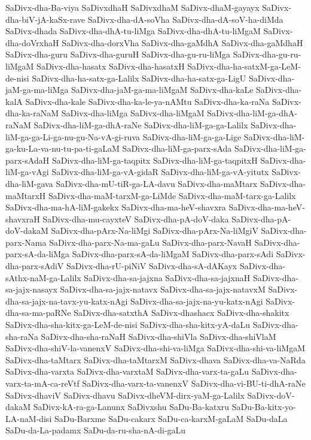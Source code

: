 {SaDivx-dha-Ba-viya
SaDivxdhaH
SaDivxdhaM
SaDivx-dhaM-gayayx
SaDivx-dha-biV-jA-kaSx-rave
SaDivx-dha-dA-soVha
SaDivx-dha-dA-soV-ha-diMda
SaDivx-dhada
SaDivx-dha-dhA-tu-liMga
SaDivx-dha-dhA-tu-liMgaM
SaDivx-dha-doVrxhaH
SaDivx-dha-dorxVha
SaDivx-dha-gaMdhA
SaDivx-dha-gaMdhaH
SaDivx-dha-guru
SaDivx-dha-guruH
SaDivx-dha-gu-ru-liMga
SaDivx-dha-gu-ru-liMgaM
SaDivx-dha-hasatx
SaDivx-dha-hasatxH
SaDivx-dha-ha-satxM-ga-LeM-de-nisi
SaDivx-dha-ha-satx-ga-Lalilx
SaDivx-dha-ha-satx-ga-LigU
SaDivx-dha-jaM-ga-ma-liMga
SaDivx-dha-jaM-ga-ma-liMgaM
SaDivx-dha-kaLe
SaDivx-dha-kalA
SaDivx-dha-kale
SaDivx-dha-ka-le-ya-nAMtu
SaDivx-dha-ka-raNa
SaDivx-dha-ka-raNaM
SaDivx-dha-liMga
SaDivx-dha-liMgaM
SaDivx-dha-liM-ga-dhA-raNaM
SaDivx-dha-liM-ga-dhA-raNe
SaDivx-dha-liM-ga-ga-Lalilx
SaDivx-dha-liM-ga-ga-Li-ga-nu-gu-Na-vA-gi-ruva
SaDivx-dha-liM-ga-ga-Lige
SaDivx-dha-liM-ga-ku-La-va-nu-tu-pa-ti-gaLaM
SaDivx-dha-liM-ga-parx-sAda
SaDivx-dha-liM-ga-parx-sAdaH
SaDivx-dha-liM-ga-taqpitx
SaDivx-dha-liM-ga-taqpitxH
SaDivx-dha-liM-ga-vAgi
SaDivx-dha-liM-ga-vA-gidaR
SaDivx-dha-liM-ga-vA-yitutx
SaDivx-dha-liM-gava
SaDivx-dha-mU-tiR-ga-LA-davu
SaDivx-dha-maMtarx
SaDivx-dha-maMtarxH
SaDivx-dha-maM-tarxM-ga-LiMde
SaDivx-dha-maM-tarx-ga-Lalilx
SaDivx-dha-ma-hA-liM-gakekx
SaDivx-dha-ma-heV-shavxra
SaDivx-dha-ma-heV-shavxraH
SaDivx-dha-mu-cayxteV
SaDivx-dha-pA-doV-daka
SaDivx-dha-pA-doV-dakaM
SaDivx-dha-pArx-Na-liMgi
SaDivx-dha-pArx-Na-liMgiV
SaDivx-dha-parx-Nama
SaDivx-dha-parx-Na-ma-gaLu
SaDivx-dha-parx-NavaH
SaDivx-dha-parx-sA-da-liMga
SaDivx-dha-parx-sA-da-liMgaM
SaDivx-dha-parx-sAdi
SaDivx-dha-parx-sAdiV
SaDivx-dha-rU-piNiV
SaDivx-dha-sA-dAKayx
SaDivx-dha-sAthx-naM-ga-Lalilx
SaDivx-dha-sa-jajxna
SaDivx-dha-sa-jajxnaH
SaDivx-dha-sa-jajx-nasayx
SaDivx-dha-sa-jajx-natavx
SaDivx-dha-sa-jajx-natavxM
SaDivx-dha-sa-jajx-na-tavx-yu-katx-nAgi
SaDivx-dha-sa-jajx-na-yu-katx-nAgi
SaDivx-dha-sa-ma-paRNe
SaDivx-dha-satxthA
SaDivx-dhashacx
SaDivx-dha-shakitx
SaDivx-dha-sha-kitx-ga-LeM-de-nisi
SaDivx-dha-sha-kitx-yA-daLu
SaDivx-dha-sha-raNa
SaDivx-dha-sha-raNaH
SaDivx-dha-shiVla
SaDivx-dha-shiVlaM
SaDivx-dha-shiV-la-vanenxV
SaDivx-dha-shi-va-liMga
SaDivx-dha-shi-va-liMgaM
SaDivx-dha-taMtarx
SaDivx-dha-taMtarxM
SaDivx-dhava
SaDivx-dha-va-NaRda
SaDivx-dha-varxta
SaDivx-dha-varxtaM
SaDivx-dha-varx-ta-gaLu
SaDivx-dha-varx-ta-mA-ca-reVtf
SaDivx-dha-varx-ta-vanenxV
SaDivx-dha-vi-BU-ti-dhA-raNe
SaDivx-dhaviV
SaDivx-dhavu
SaDivx-dheVM-dirx-yaM-ga-Lalilx
SaDivx-doV-dakaM
SaDivx-kA-ra-ga-Lanunx
SaDivxshu
SaDu-Ba-katxru
SaDu-Ba-kitx-yo-LA-naM-disi
SaDu-Barxme
SaDu-cakarx
SaDu-ca-karxM-gaLaM
SaDu-daLa
SaDu-da-La-padamx
SaDu-da-ru-sha-nA-di-gaLu
}

